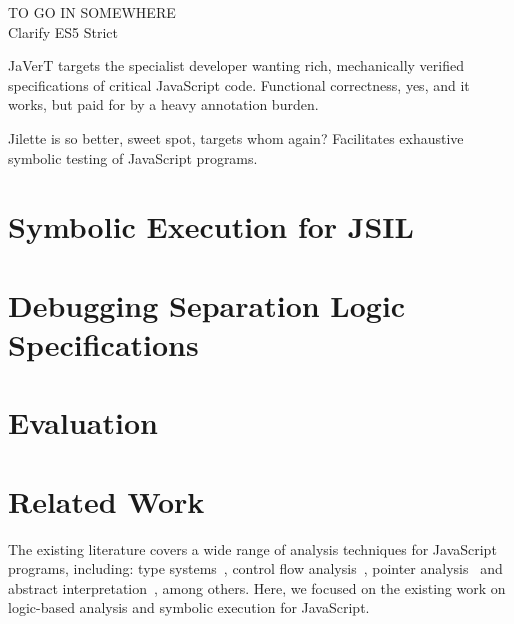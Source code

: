 \documentclass{llncs}
\newcommand{\jsil}{JSIL\xspace}
\newcommand{\polish}[1]{{\color{red}#1}}
\newcommand{\myparagraph}[1]{\smallskip\noindent {\bf #1.}\hspace{1pt}}
\begin{document}
\myparagraph{What's in the paper}

\bigskip
\polish{TO GO IN SOMEWHERE \\

Clarify ES5 Strict

JaVerT targets the specialist
developer wanting rich, mechanically verified specifications of critical JavaScript code.
Functional correctness, yes, and it works, but paid for by a heavy annotation burden.

Jilette is so better, sweet spot, targets whom again? 
Facilitates exhaustive symbolic testing of JavaScript programs.}




\newpage
\section{Symbolic Execution for \jsil}\label{sec:jsil:symb:exec}


\section{Debugging Separation Logic Specifications}\label{sec:specs}


\section{Evaluation}



\section{Related Work} 

The existing literature covers a wide range of analysis techniques for JavaScript programs, including: 
type systems~\cite{thiemann:esop:2005,anderson:ecoop:2005,jensen:sas:2009,typescript:toot:2014,feldthaus:oopsla:2014,bierman:ecoop:2014,rastogi:popl:2015},
control flow analysis~\cite{feldthaus2013efficient}, pointer analysis~\cite{jang2009points,sridharan:ecoop:12} and abstract
interpretation~\cite{kashyap:fse:14,jensen:sas:2009,andreasen:oopsla:2014,park:ecoop:15}, among others. 
Here, we focused on the existing work on logic-based analysis and symbolic execution for JavaScript. 
\end{document}
